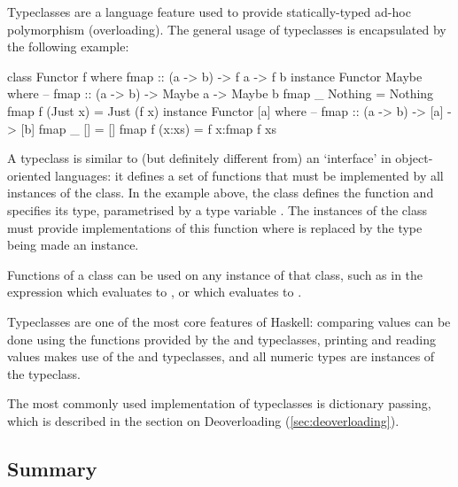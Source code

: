 \documentclass[dissertation.tex]{subfiles}
\begin{document}
{{        Typeclasses are a language feature used to provide statically-typed ad-hoc polymorphism (overloading). The
        general usage of typeclasses is encapsulated by the following example:

        \begin{haskellfigure}
        class Functor f where
            fmap :: (a -> b) -> f a -> f b
        instance Functor Maybe where
            -- fmap :: (a -> b) -> Maybe a -> Maybe b
            fmap _ Nothing = Nothing
            fmap f (Just x) = Just (f x)
        instance Functor [a] where
            -- fmap :: (a -> b) -> [a] -> [b]
            fmap _ [] = []
            fmap f (x:xs) = f x:fmap f xs
        \end{haskellfigure}

        A typeclass is similar to (but definitely different from) an `interface' in object-oriented languages: it
        defines a set of functions that must be implemented by all instances of the class. In the example above, the
         class defines the  function and specifies its type, parametrised by a type
        variable . The instances of the class must provide implementations of this function where 
        is replaced by the type being made an instance.

        Functions of a class can be used on any instance of that class, such as in the expression  which evaluates to \haskell{[2,4,6]}, or  which evaluates
        to .

        Typeclasses are one of the most core features of Haskell: comparing values can be done using the functions
        provided by the  and  typeclasses, printing and reading values makes use of the
         and  typeclasses, and all numeric types are instances of the 
        typeclass.

        The most commonly used implementation of typeclasses is dictionary passing, which is described in the section on
        Deoverloading (\ref{sec:deoverloading}).

    }
    \subsection{Summary}
    {

}}
\end{document}
